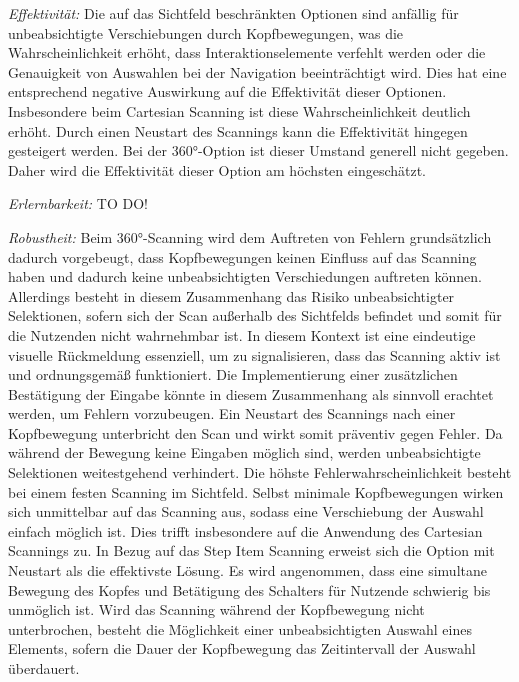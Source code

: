\textit{Effektivität:}
Die auf das Sichtfeld beschränkten Optionen sind anfällig für unbeabsichtigte Verschiebungen durch Kopfbewegungen, was die Wahrscheinlichkeit erhöht, dass Interaktionselemente verfehlt werden oder die Genauigkeit von Auswahlen bei der Navigation beeinträchtigt wird. Dies hat eine entsprechend negative Auswirkung auf die Effektivität dieser Optionen. Insbesondere beim Cartesian Scanning ist diese Wahrscheinlichkeit deutlich erhöht. Durch einen Neustart des Scannings kann die Effektivität hingegen gesteigert werden. Bei der 360°-Option ist dieser Umstand generell nicht gegeben. Daher wird die Effektivität dieser Option am höchsten eingeschätzt. 


\textit{Erlernbarkeit:} TO DO! 

\textit{Robustheit:}
Beim 360°-Scanning wird dem Auftreten von Fehlern grundsätzlich dadurch vorgebeugt, dass Kopfbewegungen keinen Einfluss auf das Scanning haben und dadurch keine unbeabsichtigten Verschiedungen auftreten können. Allerdings besteht in diesem Zusammenhang das Risiko unbeabsichtigter Selektionen, sofern sich der Scan außerhalb des Sichtfelds befindet und somit für die Nutzenden nicht wahrnehmbar ist. In diesem Kontext ist eine eindeutige visuelle Rückmeldung essenziell, um zu signalisieren, dass das Scanning aktiv ist und ordnungsgemäß funktioniert. Die Implementierung einer zusätzlichen Bestätigung der Eingabe könnte in diesem Zusammenhang als sinnvoll erachtet werden, um Fehlern vorzubeugen. 
Ein Neustart des Scannings nach einer Kopfbewegung unterbricht den Scan und wirkt somit präventiv gegen Fehler. Da während der Bewegung keine Eingaben möglich sind, werden unbeabsichtigte Selektionen weitestgehend verhindert. Die höhste Fehlerwahrscheinlichkeit besteht bei einem festen Scanning im Sichtfeld. Selbst minimale Kopfbewegungen wirken sich unmittelbar auf das Scanning aus, sodass eine Verschiebung der Auswahl einfach möglich ist. Dies trifft insbesondere auf die Anwendung des Cartesian Scannings zu. 
In Bezug auf das Step Item Scanning erweist sich die Option mit Neustart als die effektivste Lösung. Es wird angenommen, dass eine simultane Bewegung des Kopfes und Betätigung des Schalters für Nutzende schwierig bis unmöglich ist.  
Wird das Scanning während der Kopfbewegung nicht unterbrochen, besteht die Möglichkeit einer unbeabsichtigten Auswahl eines Elements, sofern die Dauer der Kopfbewegung das Zeitintervall der Auswahl überdauert. 

